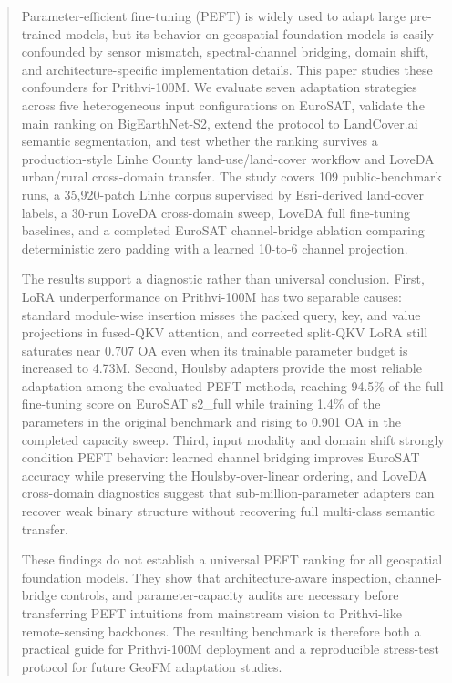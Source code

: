 \begin{abstract}
Parameter-efficient fine-tuning (PEFT) is widely used to adapt large pre-trained models, but its behavior on geospatial foundation models is easily confounded by sensor mismatch, spectral-channel bridging, domain shift, and architecture-specific implementation details. This paper studies these confounders for Prithvi-100M. We evaluate seven adaptation strategies across five heterogeneous input configurations on EuroSAT, validate the main ranking on BigEarthNet-S2, extend the protocol to LandCover.ai semantic segmentation, and test whether the ranking survives a production-style Linhe County land-use/land-cover workflow and LoveDA urban/rural cross-domain transfer. The study covers 109 public-benchmark runs, a 35{,}920-patch Linhe corpus supervised by Esri-derived land-cover labels, a 30-run LoveDA cross-domain sweep, LoveDA full fine-tuning baselines, and a completed EuroSAT channel-bridge ablation comparing deterministic zero padding with a learned 10-to-6 channel projection.

The results support a diagnostic rather than universal conclusion. First, LoRA underperformance on Prithvi-100M has two separable causes: standard module-wise insertion misses the packed query, key, and value projections in fused-QKV attention, and corrected split-QKV LoRA still saturates near 0.707 OA even when its trainable parameter budget is increased to 4.73M. Second, Houlsby adapters provide the most reliable adaptation among the evaluated PEFT methods, reaching 94.5\% of the full fine-tuning score on EuroSAT s2\_full while training 1.4\% of the parameters in the original benchmark and rising to 0.901 OA in the completed capacity sweep. Third, input modality and domain shift strongly condition PEFT behavior: learned channel bridging improves EuroSAT accuracy while preserving the Houlsby-over-linear ordering, and LoveDA cross-domain diagnostics suggest that sub-million-parameter adapters can recover weak binary structure without recovering full multi-class semantic transfer.

These findings do not establish a universal PEFT ranking for all geospatial foundation models. They show that architecture-aware inspection, channel-bridge controls, and parameter-capacity audits are necessary before transferring PEFT intuitions from mainstream vision to Prithvi-like remote-sensing backbones. The resulting benchmark is therefore both a practical guide for Prithvi-100M deployment and a reproducible stress-test protocol for future GeoFM adaptation studies.
\end{abstract}
